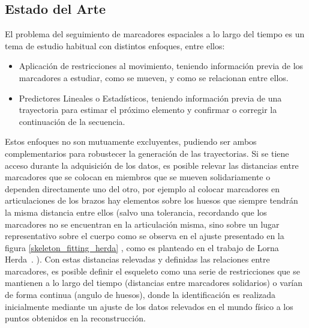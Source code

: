 \subsection{Estado del Arte}

El problema del seguimiento de marcadores espaciales a lo largo del tiempo es un tema de estudio habitual con distintos enfoques, entre ellos:

\begin{itemize}

\item Aplicación de restricciones al movimiento, teniendo información previa de los marcadores a estudiar, como se mueven, y como se relacionan entre ellos. 

\item Predictores Lineales o Estadísticos, teniendo información previa de una trayectoria para estimar el próximo elemento y confirmar o corregir la continuación de la secuencia.

\end{itemize}

Estos enfoques no son mutuamente excluyentes, pudiendo ser ambos complementarios para robustecer la generación de las trayectorias. Si se tiene acceso durante la adquisición de los datos, es posible relevar las distancias entre marcadores que se colocan en miembros que se mueven solidariamente  o dependen directamente uno del otro, por ejemplo al colocar marcadores en articulaciones de los brazos hay elementos sobre los huesos que siempre tendrán la misma distancia entre ellos (salvo una tolerancia, recordando que los marcadores no se encuentran en la articulación misma, sino sobre un lugar representativo sobre el cuerpo como se observa en el ajuste presentado en la figura \ref{skeleton_fitting_herda} , como es planteado en el trabajo de Lorna Herda~\cite{herda}. ). Con estas distancias relevadas y definidas las relaciones entre marcadores, es posible definir el esqueleto como una serie de restricciones que se mantienen a lo largo del tiempo (distancias entre marcadores solidarios) o varían de forma continua (angulo de huesos), donde la identificación es realizada inicialmente mediante un ajuste de los datos relevados en el mundo físico a los puntos obtenidos en la reconstrucción. 


